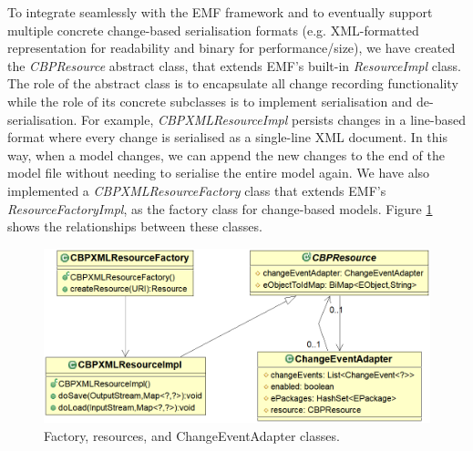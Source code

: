 \documentclass[conference]{IEEEtran}
\begin{document}
To integrate seamlessly with the EMF framework and to eventually support multiple concrete change-based serialisation formats (e.g. XML-formatted representation for readability and binary for performance/size), we have created the \emph{CBPResource} abstract class, that extends EMF's built-in \emph{ResourceImpl} class. The role of the abstract class is to encapsulate all change recording functionality while the role of its concrete subclasses is to implement serialisation and de-serialisation. For example, \emph{CBPXMLResourceImpl} persists changes in a line-based format where every change is serialised as a single-line XML document. In this way, when a model changes, we can append the new changes to the end of the model file without needing to serialise the entire model again. We have also implemented a \emph{CBPXMLResourceFactory} class that extends EMF's \emph{ResourceFactoryImpl}, as the factory class for change-based models. Figure \ref{fig:resources} shows the relationships between these classes.



\begin{figure}[th]
\centering
\includegraphics[scale=0.32]{resources}
\caption{Factory, resources, and ChangeEventAdapter classes.}
\label{fig:resources}
\end{figure}
\end{document}
